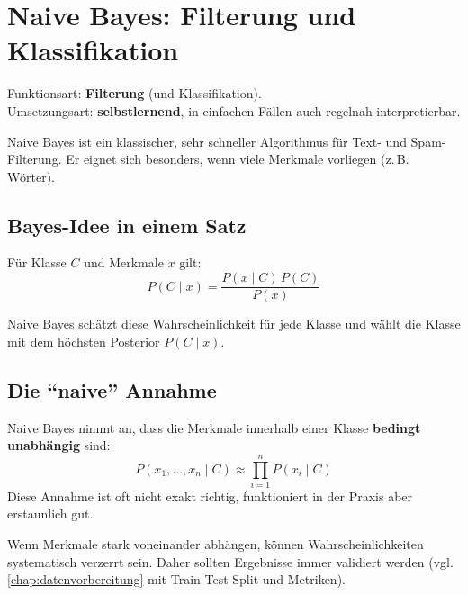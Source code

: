 \chapter{Naive Bayes: Filterung und Klassifikation}
\label{chap:naivebayes}

\begin{myremark}
    Funktionsart: \textbf{Filterung} (und Klassifikation). \\
    Umsetzungsart: \textbf{selbstlernend}, in einfachen Fällen auch regelnah interpretierbar.
\end{myremark}

\begin{myremark}
    Naive Bayes ist ein klassischer,
    sehr schneller Algorithmus für Text- und Spam-Filterung.
    Er eignet sich besonders, wenn viele Merkmale vorliegen (z.\,B. Wörter).
\end{myremark}

\section{Bayes-Idee in einem Satz}

\begin{mydefinition}
    Für Klasse $C$ und Merkmale $x$ gilt:
    \[
        P(C\mid x)=\frac{P(x\mid C)\,P(C)}{P(x)}
    \]

    Naive Bayes schätzt diese Wahrscheinlichkeit für jede Klasse und wählt
    die Klasse mit dem höchsten Posterior $P(C\mid x)$.
\end{mydefinition}

\section{Die \enquote{naive} Annahme}

\begin{mydefinition}
    Naive Bayes nimmt an, dass die Merkmale innerhalb einer Klasse
    \textbf{bedingt unabhängig} sind:
    \[
        P(x_1,\ldots,x_n\mid C) \approx \prod_{i=1}^n P(x_i\mid C)
    \]
    Diese Annahme ist oft nicht exakt richtig, funktioniert in der Praxis
    aber erstaunlich gut.
\end{mydefinition}

\begin{mycaution}
    Wenn Merkmale stark voneinander abhängen, können Wahrscheinlichkeiten
    systematisch verzerrt sein. Daher sollten Ergebnisse immer validiert werden
    (vgl.  \cref{chap:datenvorbereitung} mit Train-Test-Split und Metriken).
\end{mycaution}

